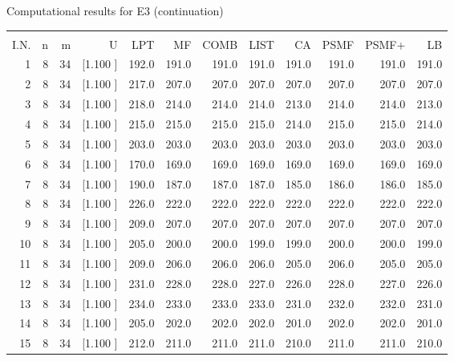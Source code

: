 \documentclass[12pt,a4paper]{article}
\begin{document}
\newpage
\begin{center}
 Computational results for E3 (continuation) {\tiny
\begin{tabular}{r r r r r r r r r r r r}\hline
    &   &   &          &        &        &        &        &        &        &        &       \\[-0.1in]
  I.N.  &  n  &  m  &  U  &  LPT  &  MF  &  COMB  &  LIST  &  CA  & PSMF &PSMF+ & LB \\[0.03in]
\hline
   1&  8& 34&[1.100     ]&   192.0&   191.0&   191.0&   191.0&   191.0&   191.0&   191.0&   191.0\\[-0.02in]
   2&  8& 34&[1.100     ]&   217.0&   207.0&   207.0&   207.0&   207.0&   207.0&   207.0&   207.0\\[-0.02in]
   3&  8& 34&[1.100     ]&   218.0&   214.0&   214.0&   214.0&   213.0&   214.0&   214.0&   213.0\\[-0.02in]
   4&  8& 34&[1.100     ]&   215.0&   215.0&   215.0&   215.0&   214.0&   215.0&   215.0&   214.0\\[-0.02in]
   5&  8& 34&[1.100     ]&   203.0&   203.0&   203.0&   203.0&   203.0&   203.0&   203.0&   203.0\\[-0.02in]
   6&  8& 34&[1.100     ]&   170.0&   169.0&   169.0&   169.0&   169.0&   169.0&   169.0&   169.0\\[-0.02in]
   7&  8& 34&[1.100     ]&   190.0&   187.0&   187.0&   187.0&   185.0&   186.0&   186.0&   185.0\\[-0.02in]
   8&  8& 34&[1.100     ]&   226.0&   222.0&   222.0&   222.0&   222.0&   222.0&   222.0&   222.0\\[-0.02in]
   9&  8& 34&[1.100     ]&   209.0&   207.0&   207.0&   207.0&   207.0&   207.0&   207.0&   207.0\\[-0.02in]
  10&  8& 34&[1.100     ]&   205.0&   200.0&   200.0&   199.0&   199.0&   200.0&   200.0&   199.0\\[-0.02in]
  11&  8& 34&[1.100     ]&   209.0&   206.0&   206.0&   206.0&   205.0&   206.0&   205.0&   205.0\\[-0.02in]
  12&  8& 34&[1.100     ]&   231.0&   228.0&   228.0&   227.0&   226.0&   228.0&   227.0&   226.0\\[-0.02in]
  13&  8& 34&[1.100     ]&   234.0&   233.0&   233.0&   233.0&   231.0&   232.0&   232.0&   231.0\\[-0.02in]
  14&  8& 34&[1.100     ]&   205.0&   202.0&   202.0&   202.0&   201.0&   202.0&   202.0&   201.0\\[-0.02in]
  15&  8& 34&[1.100     ]&   212.0&   211.0&   211.0&   211.0&   210.0&   211.0&   211.0&   210.0\\[-0.02in]

\end{tabular}}
\end{center}
\end{document}
